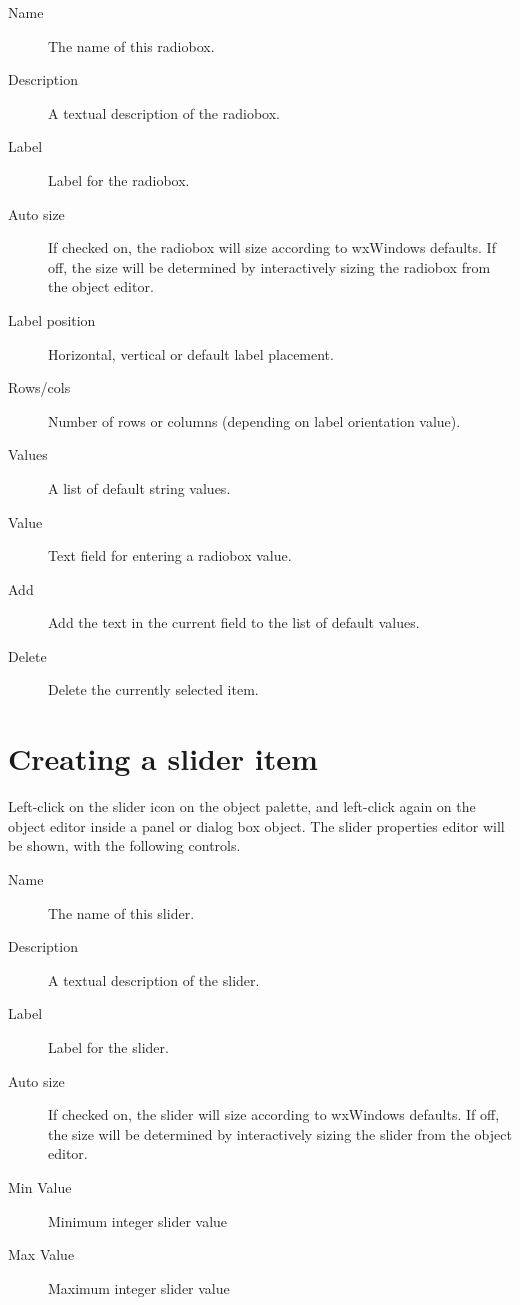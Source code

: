 \begin{description}
\item[Name] The name of this radiobox.
\item[Description] A textual description of the radiobox.
\item[Label] Label for the radiobox.
\item[Auto size] If checked on, the radiobox will size according to
wxWindows defaults. If off, the size will be determined by interactively sizing
the radiobox from the object editor.
\item[Label position] Horizontal, vertical or default label placement.
\item[Rows/cols] Number of rows or columns (depending on label orientation
value).
\item[Values] A list of default string values.
\item[Value] Text field for entering a radiobox value.
\item[Add] Add the text in the current field to the list of default values.
\item[Delete] Delete the currently selected item.
\end{description}

\section{Creating a slider item}

Left-click on the slider icon on the object palette, and left-click
again on the object editor inside a panel or dialog box object. The
slider properties editor will be shown, with the following
controls.

\begin{description}
\item[Name] The name of this slider.
\item[Description] A textual description of the slider.
\item[Label] Label for the slider.
\item[Auto size] If checked on, the slider will size according to
wxWindows defaults. If off, the size will be determined by interactively sizing
the slider from the object editor.
\item[Min Value] Minimum integer slider value
\item[Max Value] Maximum integer slider value
\end{description}

